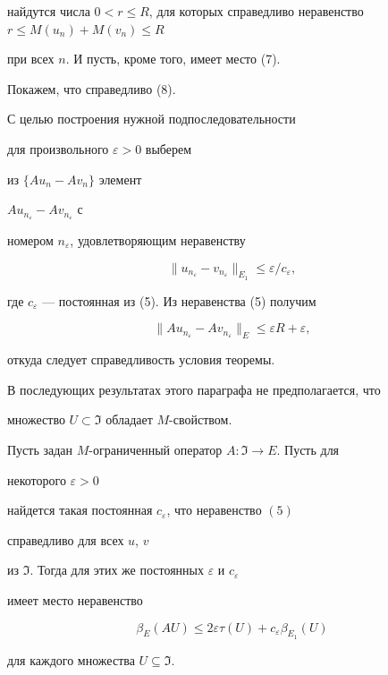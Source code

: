 \begin{pf}
найдутся числа $0<r\le R$, для которых справедливо неравенство $r\le 


M(u_n)+M(v_n)\le R$ 


при всех $n$. И пусть, кроме того, имеет место (7). 


Покажем, что справедливо (8). 


 


С целью построения нужной подпоследовательности  


для произвольного $\varepsilon>0$ выберем  


из $\{A{}u_n-A{}v_n\}$ элемент 


$A{}u_{n_\varepsilon}-A{}v_{n_\varepsilon}$ с 


номером $n_\varepsilon$, удовлетворяющим неравенству 


$$ 


\|u_{n_\varepsilon}-v_{n_\varepsilon}\|_{E_1}\le 


\varepsilon/c_\varepsilon, 


$$ 


где $c_\varepsilon$ --- постоянная из (5). Из неравенства (5) получим 


$$ 


\|A u_{n_\varepsilon}-A v_{n_\varepsilon}\|_E\le 


\varepsilon R+\varepsilon, 


$$ 


откуда следует справедливость условия теоремы. 


\end{pf} 


 


В последующих результатах этого параграфа не предполагается, что  


множество $U\subset\Im$ обладает $M$-свойством. 


 


\begin{thm} 


Пусть задан $M$-ограниченный оператор $A:\Im\to E$. Пусть для 


некоторого $\varepsilon>0$ 


найдется такая постоянная $c_\varepsilon$, что неравенство $(5)$ 


справедливо для всех $u$, $v$ 


из $\Im$. Тогда для этих же постоянных $\varepsilon$ и $c_\varepsilon$ 


имеет место неравенство 


\begin{equation} 


\beta_E(A U)\le2\varepsilon\tau(U)+ 


c_\varepsilon\beta_{E_1}(U) 


\end{equation} 


для каждого множества $U\subseteq\Im$. 


\end{thm} 


